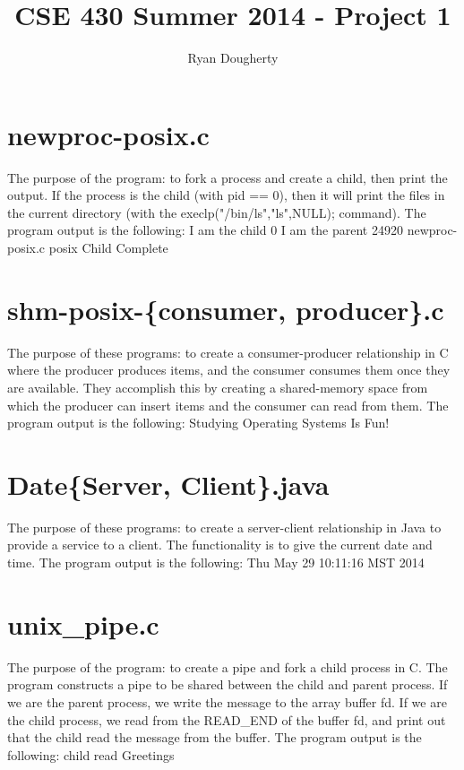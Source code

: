 \documentclass[12pt]{article}
\title{CSE 430 Summer 2014 - Project 1}
\author{Ryan Dougherty}
\date{}                                           %
\begin{document}
\maketitle


\section{newproc-posix.c}
The purpose of the program: to fork a process and create a child, then print the output. If the process is the child (with pid == 0), then it will print the files in the current directory (with the execlp("/bin/ls","ls",NULL); command). The program output is the following:
{\color{blue}
\newline I am the child 0
\newline I am the parent 24920
\newline newproc-posix.c  posix
\newline Child Complete
}

\section{shm-posix-\{consumer, producer\}.c}
The purpose of these programs: to create a consumer-producer relationship in C where the producer produces items, and the consumer consumes them once they are available. They accomplish this by creating a shared-memory space from which the producer can insert items and the consumer can read from them. The program output is the following:
{\color{blue}
\newline Studying Operating Systems Is Fun!
}

\section{Date\{Server, Client\}.java}
The purpose of these programs: to create a server-client relationship in Java to provide a service to a client. The functionality is to give the current date and time. The program output is the following:
{\color{blue}
\newline Thu May 29 10:11:16 MST 2014
}

\section{unix\_pipe.c}
The purpose of the program: to create a pipe and fork a child process in C. The program constructs a pipe to be shared between the child and parent process. If we are the parent process, we write the message to the array buffer fd. If we are the child process, we read from the READ\_END of the buffer fd, and print out that the child read the message from the buffer. The program output is the following:
{\color{blue}
\newline child read Greetings
}
\end{document}
